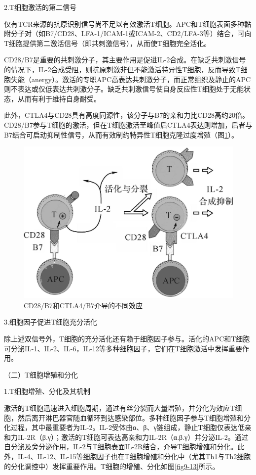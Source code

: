 2.T细胞激活的第二信号

仅有TCR来源的抗原识别信号尚不足以有效激活T细胞。APC和T细胞表面多种黏附分子对（如B7/CD28、LFA-1/ICAM-1或ICAM-2、CD2/LFA-3等）结合，可向T细胞提供第二激活信号（即共刺激信号），从而使T细胞完全活化。

CD28/B7是重要的共刺激分子，其主要作用是促进IL-2合成。在缺乏共刺激信号的情况下，IL-2合成受阻，则抗原刺激非但不能激活特异性T细胞，反而导致T细胞失能（anergy）。激活的专职APC高表达共刺激分子，而正常组织及静止的APC则不表达或仅低表达共刺激分子。缺乏共刺激信号使自身反应性T细胞处于无能状态，从而有利于维持自身耐受。

此外，CTLA4与CD28具有高度同源性，该分子与B7的亲和力比CD28高约20倍。CD28/B7参与T细胞的激活，但在T细胞激活至峰值后CTLA4表达则增加，后者与B7结合可启动抑制性信号，从而有效制约特异性T细胞克隆过度增殖（图\ref{fig9-12}）。

\begin{figure}[!htbp]
 \centering
 \includegraphics[width=.5\textwidth]{./images/Image00138.jpg}
 \captionsetup{justification=centering}
 \caption{CD28/B7和CTLA4/B7介导的不同效应}
 \label{fig9-12}
  \end{figure} 

3.细胞因子促进T细胞充分活化

除上述双信号外，T细胞的充分活化还有赖于细胞因子参与。活化的APC和T细胞可分泌IL-1、IL-2、IL-6，IL-12等多种细胞因子，它们在T细胞激活中发挥重要作用。

（二）T细胞增殖和分化

1.T细胞增殖、分化及其机制

激活的T细胞迅速进入细胞周期，通过有丝分裂而大量增殖，并分化为效应T细胞，然后离开淋巴器官随血循环到达感染部位。多种细胞因子参与T细胞增殖和分化过程，其中最重要者为IL-2。IL-2受体由α、β、γ链组成，静止T细胞仅表达低亲和力IL-2R（β.γ）；激活的T细胞可表达高亲和力IL-2R（α.β.γ）并分泌IL-2。通过自分泌及旁分泌作用，IL-2与T细胞表面IL-2R结合，介导T细胞增殖和分化。此外，IL-4、IL-12、IL-15等细胞因子也在T细胞增殖和分化中（尤其Th1与Th2细胞的分化调控中）发挥重要作用。T细胞的增殖、分化如图\ref{fig9-13}所示。

